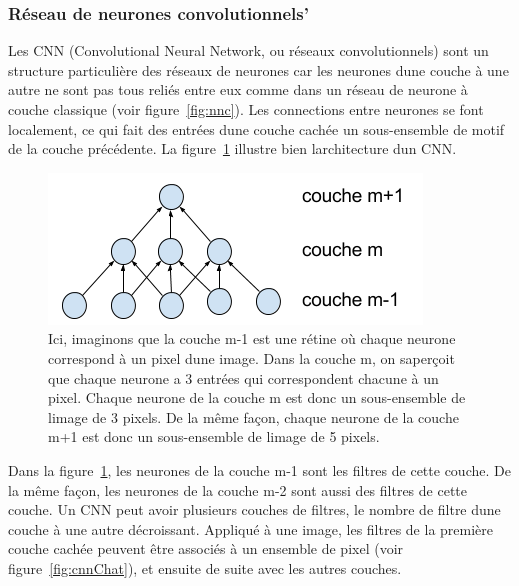 \documentclass[11pt]{sdm}
\begin{document}
		\subsubsection{R\'eseau de neurones convolutionnels'}
			Les CNN (Convolutional Neural Network, ou r\'eseaux convolutionnels) sont un structure particuli\`ere des r\'eseaux de neurones car les neurones d\textquotesingle une couche \`a une autre ne sont pas tous reli\'es entre eux comme dans un r\'eseau de neurone \`a couche classique (voir figure~\ref{fig:nnc}). Les connections entre neurones se font localement, ce qui fait des entr\'ees d\textquotesingle une couche cach\'ee un sous-ensemble de motif de la couche pr\'ec\'edente. La figure~\ref{fig:cnn} illustre bien l\textquotesingle architecture d\textquotesingle un CNN.

			\begin{figure}[!ht]
				\centering
				\includegraphics[natwidth=375,natheight=152]{figures/architectureCNN.png}
				\caption{Ici, imaginons que la couche m-1 est une r\'etine o\`u chaque neurone correspond \`a un pixel d\textquotesingle une image. Dans la couche m, on s\textquotesingle aper\c coit que chaque neurone a 3 entr\'ees qui correspondent chacune \`a un pixel. Chaque neurone de la couche m est donc un sous-ensemble de l\textquotesingle image de 3 pixels. De la m\^eme fa\c con, chaque neurone de la couche m+1 est donc un sous-ensemble de l\textquotesingle image de 5 pixels.}
				\label{fig:cnn}
			\end{figure}

			Dans la figure~\ref{fig:cnn}, les neurones de la couche m-1 sont les filtres de cette couche. De la m\^eme fa\c con, les neurones de la couche m-2 sont aussi des filtres de cette couche. Un CNN peut avoir plusieurs couches de filtres, le nombre de filtre d\textquotesingle une couche \`a une autre d\'ecroissant.
			Appliqu\'e \`a une image, les filtres de la premi\`ere couche cach\'ee peuvent \^etre associ\'es \`a un ensemble de pixel (voir figure~\ref{fig:cnnChat}), et ensuite de suite avec les autres couches.
\end{document}
